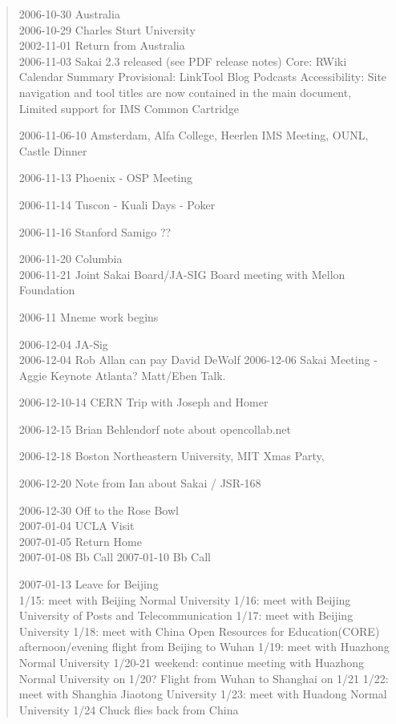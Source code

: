 \begin{quote}
2006-10-30 Australia\\
2006-10-29 Charles Sturt University\\
2002-11-01 Return from Australia\\

2006-11-03 Sakai 2.3 released (see PDF release notes)
Core: 
RWiki
Calendar Summary
Provisional:
LinkTool 
Blog 
Podcasts
Accessibility: Site navigation and tool titles are now contained in the main document, 
Limited support for IMS Common Cartridge

2006-11-06-10 Amsterdam, Alfa College, Heerlen IMS Meeting, 
OUNL, Castle Dinner

2006-11-13 Phoenix - OSP Meeting

2006-11-14 Tuscon - Kuali Days - Poker

2006-11-16 Stanford Samigo ??

2006-11-20 Columbia\\
2006-11-21 Joint Sakai Board/JA-SIG Board meeting with Mellon Foundation

2006-11 Mneme work begins

2006-12-04 JA-Sig\\
2006-12-04 Rob Allan can pay David DeWolf
2006-12-06 Sakai Meeting - Aggie Keynote Atlanta?  Matt/Eben Talk.

2006-12-10-14 CERN Trip with Joseph and Homer

2006-12-15 Brian Behlendorf note about opencollab.net 

2006-12-18 Boston Northeastern University, MIT Xmas Party, 

2006-12-20 Note from Ian about Sakai / JSR-168

2006-12-30 Off to the Rose Bowl\\
2007-01-04 UCLA Visit\\
2007-01-05 Return Home\\

2007-01-08 Bb Call
2007-01-10 Bb Call

2007-01-13 Leave for Beijing\\
1/15: meet with Beijing Normal University
1/16: meet with Beijing University of Posts and Telecommunication
1/17: meet with Beijing University
1/18: meet with China Open Resources for Education(CORE)
	afternoon/evening flight from Beijing to Wuhan
1/19: meet with Huazhong Normal University
1/20-21 weekend: continue meeting with Huazhong Normal 
    University on 1/20? Flight from Wuhan to Shanghai on 1/21
1/22: meet with Shanghia Jiaotong University
1/23: meet with Huadong Normal University
1/24 Chuck flies back from China\\


\end{quote}
